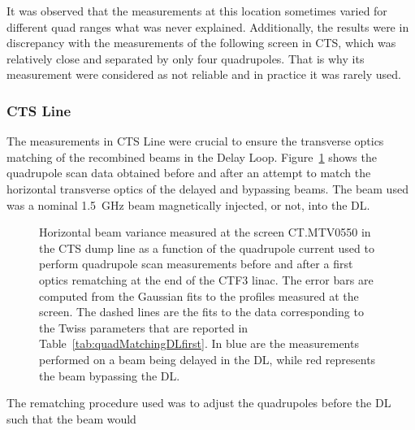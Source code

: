 It was observed that the measurements at this location sometimes 
varied for different quad ranges what was never explained.
Additionally, the results were in discrepancy with the measurements of 
the following screen in CTS, which was relatively close and separated
by only four quadrupoles. That is why its measurement were considered 
as not reliable and in practice it was rarely used.



\subsubsection{CTS Line}

The measurements in CTS Line were crucial to
ensure the transverse optics matching of the recombined beams in the Delay Loop.
Figure~\ref{fig:trasverseDLmatchingAttempt} shows the quadrupole scan  data obtained before and after
an attempt to match the horizontal transverse optics of the delayed and bypassing beams.
The beam used was a nominal 1.5~GHz beam magnetically injected, or not, into the DL. 
%
\begin{figure}[htbp]
\centering
{}
\qquad
{}
\caption{Horizontal beam variance measured at the screen CT.MTV0550 in the CTS dump line as a function
         of the quadrupole current used to perform quadrupole scan measurements before
         \protect{} and after
         \protect{} a first optics rematching at the end of
         the CTF3 linac.
         The error bars are computed from the Gaussian fits to the profiles measured at the screen.
         The dashed lines are the fits to the data corresponding to the Twiss parameters that are
         reported in Table~\ref{tab:quadMatchingDLfirst}.
         In blue are the measurements performed on a beam being delayed in the DL, while red
         represents the beam bypassing the DL.
}
\label{fig:trasverseDLmatchingAttempt}
\end{figure}
%
The rematching procedure used was to adjust the quadrupoles before the DL such that the beam would
